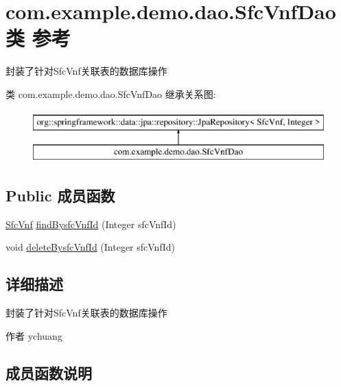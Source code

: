 \hypertarget{interfacecom_1_1example_1_1demo_1_1dao_1_1_sfc_vnf_dao}{}\section{com.\+example.\+demo.\+dao.\+Sfc\+Vnf\+Dao类 参考}
\label{interfacecom_1_1example_1_1demo_1_1dao_1_1_sfc_vnf_dao}


封装了针对\+Sfc\+Vnf关联表的数据库操作  


类 com.\+example.\+demo.\+dao.\+Sfc\+Vnf\+Dao 继承关系图\+:\begin{figure}[H]
\begin{center}
\leavevmode
\includegraphics[height=2.000000cm]{interfacecom_1_1example_1_1demo_1_1dao_1_1_sfc_vnf_dao}
\end{center}
\end{figure}
\subsection*{Public 成员函数}
\begin{DoxyCompactItemize}
\item 
\mbox{\hyperlink{classcom_1_1example_1_1demo_1_1modular_1_1_sfc_vnf}{Sfc\+Vnf}} \mbox{\hyperlink{interfacecom_1_1example_1_1demo_1_1dao_1_1_sfc_vnf_dao_a2b0be412a2ac9b8c9413e4e9b7eddb40}{find\+Bysfc\+Vnf\+Id}} (Integer sfc\+Vnf\+Id)
\item 
void \mbox{\hyperlink{interfacecom_1_1example_1_1demo_1_1dao_1_1_sfc_vnf_dao_aa18aed6bb8ab7a6793bf55a7f74faf28}{delete\+Bysfc\+Vnf\+Id}} (Integer sfc\+Vnf\+Id)
\end{DoxyCompactItemize}


\subsection{详细描述}
封装了针对\+Sfc\+Vnf关联表的数据库操作 

\begin{DoxyAuthor}{作者}
ychuang 
\end{DoxyAuthor}


\subsection{成员函数说明}
\mbox{\label{interfacecom_1_1example_1_1demo_1_1dao_1_1_sfc_vnf_dao_aa18aed6bb8ab7a6793bf55a7f74faf28}} 
